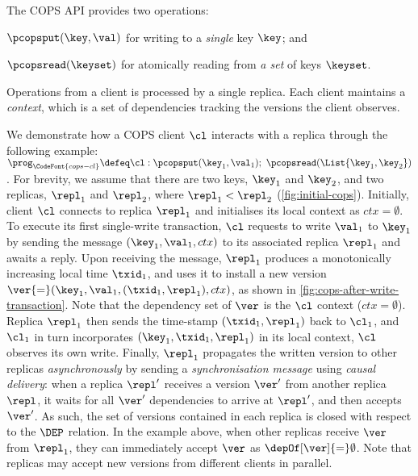 The COPS API provides two operations: 
\begin{enumerate*}
	\item \( \pcopsput(\key,\val) \) for writing to a \emph{single}
key $\key$; and 
	\item \( \pcopsread(\keyset) \) for atomically reading from \emph{a set} of keys  $\keyset$.  
\end{enumerate*}
Operations from a client is processed by a single replica. 
Each client maintains a \emph{context}, which is a set of dependencies
tracking the versions the client observes.  

We demonstrate how a COPS client \( \cl \) interacts with a replica through the following example:
\(
    \prog_\CodeFont{cops-cl} \defeq \cl: \pcopsput(\key_1,\val_1) ; \ 
    \pcopsread(\List{\key_1,\key_2})
\).
For brevity, we assume that there are two keys, $\key_1$ and $\key_2$, 
and two replicas, $\repl_1$ and $\repl_2$, where $\repl_1 < \repl_2$ (\cref{fig:initial-cops}).
Initially, client \( \cl \) connects to replica \( \repl_1 \) and initialises its local context as $ctx {=} \emptyset$.
To execute its first single-write transaction, $\cl$ requests to write $\val_1$ to $\key_1$
by sending the message $(\key_1, \val_1, ctx)$ to its associated replica $\repl_1$
and awaits a reply.
Upon receiving the message, $\repl_1$ produces a monotonically increasing local time $\txid_1$, 
and uses it to install  a new version $\ver {=} (\key_1,\val_1, (\txid_1,\repl_1), ctx)$, as shown in \cref{fig:cops-after-write-transaction}.
Note that the dependency set of $\ver$ is the $\cl$ context ($ctx {=} \emptyset$).
Replica $\repl_1$ then sends the time-stamp $(\txid_1,\repl_1)$ back to $\cl_1$, and $\cl_1$ in turn  incorporates $(\key_1, \txid_1,\repl_1)$ in its local context,
\ie $\cl$ observes its own write. 
Finally, $\repl_1$ propagates the written version to other replicas \emph{asynchronously} by sending a \emph{synchronisation message} 
using \emph{causal delivery}:
when a replica $\repl'$ receives a version $\ver'$ from another replica $\repl$, 
it waits for all $\ver'$ dependencies to arrive at $\repl'$, and then accepts $\ver'$.
As such, the set of versions contained in each replica is closed with respect to the \( \DEP \) relation.
In the example above, when other replicas receive $\ver$ from $\repl_1$, they can immediately accept $\ver$ as \( \depOf[\ver]{=}\emptyset\). 
Note that replicas may accept new versions from different clients in parallel.

